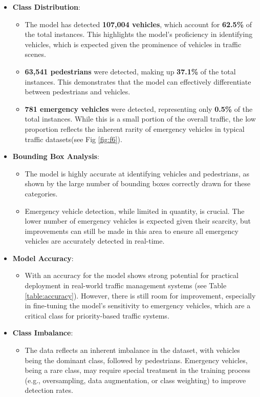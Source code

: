 \documentclass[conference]{IEEEtran}
\begin{document}
\begin{itemize}
    \item \textbf{Class Distribution}:
    \begin{itemize}
        \item The model has detected \textbf{107,004 vehicles}, which account for \textbf{62.5\%} of the total instances. This highlights the model's proficiency in identifying vehicles, which is expected given the prominence of vehicles in traffic scenes.
        \item \textbf{63,541 pedestrians} were detected, making up \textbf{37.1\%} of the total instances. This demonstrates that the model can effectively differentiate between pedestrians and vehicles.
        \item \textbf{781 emergency vehicles} were detected, representing only \textbf{0.5\%} of the total instances. While this is a small portion of the overall traffic, the low proportion reflects the inherent rarity of emergency vehicles in typical traffic datasets(see Fig \ref{fig:f6}).
    \end{itemize}

    \item \textbf{Bounding Box Analysis}:
    \begin{itemize}
        \item The model is highly accurate at identifying vehicles and pedestrians, as shown by the large number of bounding boxes correctly drawn for these categories.
        \item Emergency vehicle detection, while limited in quantity, is crucial. The lower number of emergency vehicles is expected given their scarcity, but improvements can still be made in this area to ensure all emergency vehicles are accurately detected in real-time.
    \end{itemize}

    \item \textbf{Model Accuracy}:
    \begin{itemize}
        \item With an accuracy for the model shows strong potential for practical deployment in real-world traffic management systems (see Table \ref{table:accuracy}). However, there is still room for improvement, especially in fine-tuning the model's sensitivity to emergency vehicles, which are a critical class for priority-based traffic systems.
    \end{itemize}

    \item \textbf{Class Imbalance}:
    \begin{itemize}
        \item The data reflects an inherent imbalance in the dataset, with vehicles being the dominant class, followed by pedestrians. Emergency vehicles, being a rare class, may require special treatment in the training process (e.g., oversampling, data augmentation, or class weighting) to improve detection rates.
    \end{itemize}

\end{itemize}
\end{document}
